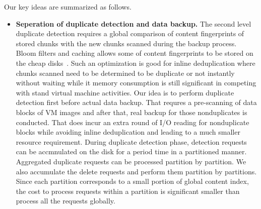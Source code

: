 Our key ideas are summarized as follows.
\begin{itemize}


\item {\bf Seperation of duplicate detection and data backup.}
The second level duplicate detection requires a global comparison of 
content fingerprints of stored chunks with the new chunks scanned during 
the backup process. Bloom filters and caching allows some of content 
fingerprints to be stored on the cheap disks~\cite{bottleneck08}. Such an optimization is good 
for inline deduplication where chunks scanned need to be determined to be duplicate or not instantly without 
waiting while  it memory consumption is still significant in competing with stand virtual 
machine activities.  Our idea is to perform duplicate detection first before actual data backup.
That requres a pre-scanning of  data  blocks of VM images and after that, real backup  for those nonduplicates
is conducted. That does incur an extra  round of I/O reading for nonduplicate blocks while avoiding inline 
deduplication and leading to a much smaller resource requirement. 
During duplicate detection phase, detection requests can be accmnulated on the disk 
for a period time  in a  partitioned manner.  Aggregated duplicate requests can be processed partition by partition. 
We also accumulate the delete requests and perform them partition by partitions. 
Since each partition corresponds to a small portion of global content index, the cost to 
process requests within a partition is significant smaller than process all the requests globally.


\end{itemize}
